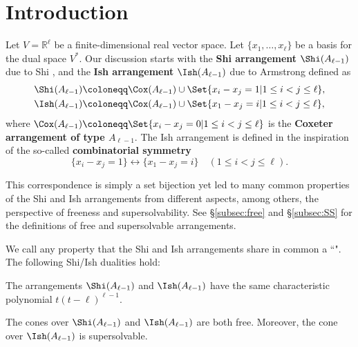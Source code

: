 \section{Introduction}
\quad
Let $V= \mathbb{R}^{\ell} $ be a finite-dimensional real vector space. 
Let $ \{x_{1}, \dots, x_{\ell}\} $ be a basis for the dual space $V^{\ast} $. 
Our discussion starts with the \textbf{Shi arrangement} $ \Shi(A_{\ell-1}) $ due to Shi \cite[Chapter 7]{Shi86},  and the \textbf{Ish arrangement} $ \Ish(A_{\ell-1}) $ due to Armstrong \cite{Arms13} defined as
\begin{equation}
\label{eq:SI}
\begin{aligned}
\Shi(A_{\ell-1}) &\coloneqq\Cox(A_{\ell-1}) \cup  \Set{ x_{i}-x_{j}= 1 | 1 \leq i < j \leq \ell}, \\
 \Ish(A_{\ell-1}) &\coloneqq\Cox(A_{\ell-1}) \cup \Set{ x_{1}-x_{j} = i | 1 \leq i < j \leq \ell},
\end{aligned}
\end{equation}
where $\Cox(A_{\ell-1})  \coloneqq \Set{ x_{i}-x_{j}=0 | 1 \leq i < j \leq \ell} $ is the  \textbf{Coxeter arrangement of type $A_{\ell-1}$}. 
The Ish arrangement is defined in the inspiration of the so-called \textbf{combinatorial symmetry} \cite{AR12} 
\begin{equation}
\label{eq:CS}
\{x_{i}-x_{j}= 1\} \longleftrightarrow \{ x_{1}-x_{j} = i\} \quad (1 \leq i < j \leq \ell).
\end{equation}

This correspondence is simply a set bijection yet led to many common properties of the Shi and Ish arrangements from different aspects, among others, the perspective of freeness and supersolvability. 
See \S\ref{subsec:free} and \S\ref{subsec:SS} for the definitions of free and supersolvable arrangements. 

We call any property that the Shi and Ish arrangements share in common a ``". 
The following Shi/Ish dualities hold: 

\begin{theorem}\label{Shi/Ish characteristic polynomial}
The arrangements $\Shi(A_{\ell-1})$ and $\Ish(A_{\ell-1})$ have the same characteristic polynomial $t(t-\ell)^{\ell-1}$. 
\end{theorem}

\begin{theorem}\label{Shi/Ish freeness}
The cones over $\Shi(A_{\ell-1})$ and $\Ish(A_{\ell-1})$ are both free. 
Moreover, the cone over $\Ish(A_{\ell-1})$ is supersolvable. 
\end{theorem}

